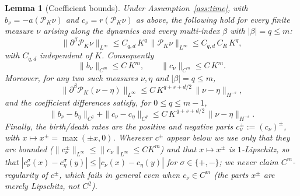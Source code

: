 \documentclass[a4paper,fleqn]{cas-sc}
\newtheorem{lemma}[theorem]{Lemma}
\theoremstyle{definition}
\theoremstyle{remark}
\begin{document}
\begin{lemma}[Coefficient bounds]\label{lem:coeff}
Under Assumption~\ref{ass:time}, with $b_\nu=-a(\mathcal P_K\nu)$ and
$c_\nu=r(\mathcal P_K\nu)$ as above, the following hold for every finite
measure $\nu$ arising along the dynamics and every multi-index $\beta$ with
$|\beta|=q\le m$:
\begin{equation}\label{equ:Bernstein_inequality}
\|\partial^\beta\mathcal P_K\nu\|_{L^\infty}
\le C_{q,d}\,K^{q}\,\|\mathcal P_K\nu\|_{L^\infty}
\le C_{q,d}\,C_R\,K^{q},
\end{equation}
with $C_{q,d}$ independent of $K$. Consequently
\begin{equation}\label{eq:Bb}
\|b_\nu\|_{C^m}\le C\,K^{m},\qquad \|c_\nu\|_{C^m}\le C\,K^{m}.
\end{equation}
Moreover, for any two such measures $\nu,\eta$ and $|\beta|=q\le m$,
\begin{equation}\label{eq:proj-diff}
\|\partial^\beta\mathcal P_K(\nu-\eta)\|_{L^\infty}
\le C\,K^{q+s+d/2}\,\|\nu-\eta\|_{H^{-s}},
\end{equation}
and the coefficient differences satisfy, for $0\le q\le m-1$,
\begin{equation}\label{eq:Blip}
\|b_\nu-b_\eta\|_{C^{q}}+\|c_\nu-c_\eta\|_{C^{q}}
\le C\,K^{\,q+s+d/2}\,\|\nu-\eta\|_{H^{-s}}.
\end{equation}
Finally, the birth/death rates are the positive and negative parts
$c^\pm_\nu:=(c_\nu)^\pm$, with $x\mapsto x^\pm=\max(\pm x,0)$. Wherever $c^\pm$ appear
below we use \emph{only} that they are bounded ($\|c^\pm_\nu\|_{L^\infty}\le\|c_\nu\|_{L^\infty}\le CK^{m}$)
and that $x\mapsto x^\pm$ is $1$-Lipschitz, so that
$|c^\sigma_\nu(x)-c^\sigma_\eta(y)|\le|c_\nu(x)-c_\eta(y)|$ for $\sigma\in\{+,-\}$;
we never claim $C^m$-regularity of $c^\pm$, which fails in general even when
$c_\nu\in C^m$ (the parts $x^\pm$ are merely Lipschitz, not $C^2$).
\end{lemma}
\end{document}
